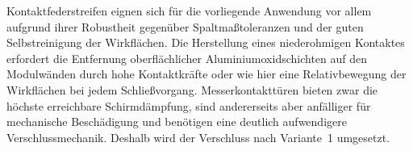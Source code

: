 Kontaktfederstreifen eignen sich für die vorliegende Anwendung vor allem aufgrund ihrer Robustheit gegenüber Spaltmaßtoleranzen und der guten Selbstreinigung der Wirkflächen. Die Herstellung eines niederohmigen Kontaktes erfordert die Entfernung oberflächlicher Aluminiumoxidschichten auf den Modulwänden durch hohe Kontaktkräfte oder wie hier eine Relativbewegung der Wirkflächen bei jedem Schließvorgang. Messerkontakttüren bieten zwar die höchste erreichbare Schirmdämpfung, sind andererseits aber anfälliger für mechanische Beschädigung und benötigen eine deutlich aufwendigere Verschlussmechanik. Deshalb wird der Verschluss nach Variante~1 umgesetzt.

